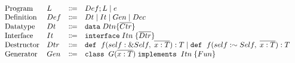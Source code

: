 \documentclass[ oneside,%
                    author={James Elgar},
                    degree={MEng},
                     title={Bidirectional transformer between functional and \\ object-oriented programming in Rust},
                  subtitle={}]{dissertation}
\begin{document}
\begin{figure}[t]
  \begin{displaymath}
    \begin{array}{l}
      \begin{array}{llcl}
        \text{Program}
        & L & \Coloneqq & Def ; L \mid e\\
        \text{Definition}
        & Def & \Coloneqq & Dt \mid It \mid Gen \mid  Dec \\
        \text{Datatype}
         & Dt & \Coloneqq & \texttt{data} \; Dtn \{ {\overline{{Ctr}}} \}\\
        \text{Interface}
         & It & \Coloneqq & \texttt{interface} \; Itn \; \{ {\overline{{Dtr}}} \}\\
        \text{Destructor}
         & Dtr & \Coloneqq & \texttt{def} \; \ f(self: \&Self, \;\overline{x: T}): T \mid \texttt{def} \; \ f(self: \sim Self, \;\overline{x: T}): T\\
        \text{Generator}
         & Gen & \Coloneqq & \texttt{class} \; \; {G} (\overline{{x} : {T}}) \; \texttt{implements} \; \; {Itn} \; \{ {{Fun}} \}\\
         
        

\end{array}
\end{array}
\end{displaymath}
\end{figure}
\end{document}

